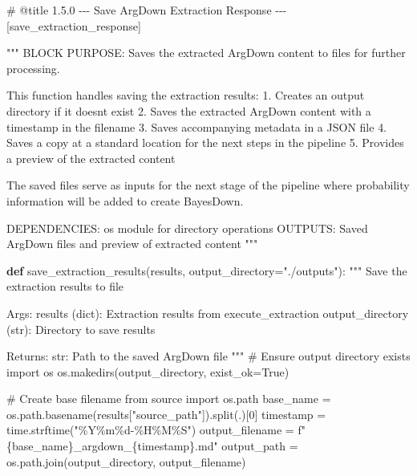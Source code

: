\documentclass[
  11pt,
  letterpaper,
]{book}
\newenvironment{Shaded}{\begin{snugshade}}{\end{snugshade}}
\newcommand{\CommentTok}[1]{\textcolor[rgb]{0.37,0.37,0.37}{#1}}
\newcommand{\DecValTok}[1]{\textcolor[rgb]{0.68,0.00,0.00}{#1}}
\newcommand{\ImportTok}[1]{\textcolor[rgb]{0.00,0.46,0.62}{#1}}
\newcommand{\KeywordTok}[1]{\textcolor[rgb]{0.00,0.23,0.31}{\textbf{#1}}}
\newcommand{\NormalTok}[1]{\textcolor[rgb]{0.00,0.23,0.31}{#1}}
\newcommand{\OperatorTok}[1]{\textcolor[rgb]{0.37,0.37,0.37}{#1}}
\newcommand{\SpecialCharTok}[1]{\textcolor[rgb]{0.37,0.37,0.37}{#1}}
\newcommand{\SpecialStringTok}[1]{\textcolor[rgb]{0.13,0.47,0.30}{#1}}
\newcommand{\StringTok}[1]{\textcolor[rgb]{0.13,0.47,0.30}{#1}}
\newcommand{\VariableTok}[1]{\textcolor[rgb]{0.07,0.07,0.07}{#1}}
\begin{document}
\label{save_extraction_response}
\begin{Shaded}
\begin{Highlighting}[]
\CommentTok{\# @title 1.5.0 {-}{-}{-} Save ArgDown Extraction Response {-}{-}{-} [save\_extraction\_response]}

\CommentTok{"""}
\CommentTok{BLOCK PURPOSE: Saves the extracted ArgDown content to files for further processing.}

\CommentTok{This function handles saving the extraction results:}
\CommentTok{1. Creates an output directory if it doesn\textquotesingle{}t exist}
\CommentTok{2. Saves the extracted ArgDown content with a timestamp in the filename}
\CommentTok{3. Saves accompanying metadata in a JSON file}
\CommentTok{4. Saves a copy at a standard location for the next steps in the pipeline}
\CommentTok{5. Provides a preview of the extracted content}

\CommentTok{The saved files serve as inputs for the next stage of the pipeline where}
\CommentTok{probability information will be added to create BayesDown.}

\CommentTok{DEPENDENCIES: os module for directory operations}
\CommentTok{OUTPUTS: Saved ArgDown files and preview of extracted content}
\CommentTok{"""}

\KeywordTok{def}\NormalTok{ save\_extraction\_results(results, output\_directory}\OperatorTok{=}\StringTok{"./outputs"}\NormalTok{):}
    \CommentTok{"""}
\CommentTok{    Save the extraction results to file}

\CommentTok{    Args:}
\CommentTok{        results (dict): Extraction results from execute\_extraction}
\CommentTok{        output\_directory (str): Directory to save results}

\CommentTok{    Returns:}
\CommentTok{        str: Path to the saved ArgDown file}
\CommentTok{    """}
    \CommentTok{\# Ensure output directory exists}
    \ImportTok{import}\NormalTok{ os}
\NormalTok{    os.makedirs(output\_directory, exist\_ok}\OperatorTok{=}\VariableTok{True}\NormalTok{)}

    \CommentTok{\# Create base filename from source}
    \ImportTok{import}\NormalTok{ os.path}
\NormalTok{    base\_name }\OperatorTok{=}\NormalTok{ os.path.basename(results[}\StringTok{"source\_path"}\NormalTok{]).split(}\StringTok{\textquotesingle{}.\textquotesingle{}}\NormalTok{)[}\DecValTok{0}\NormalTok{]}
\NormalTok{    timestamp }\OperatorTok{=}\NormalTok{ time.strftime(}\StringTok{"\%Y\%m}\SpecialCharTok{\%d}\StringTok{{-}\%H\%M\%S"}\NormalTok{)}
\NormalTok{    output\_filename }\OperatorTok{=} \SpecialStringTok{f"}\SpecialCharTok{\{}\NormalTok{base\_name}\SpecialCharTok{\}}\SpecialStringTok{\_argdown\_}\SpecialCharTok{\{}\NormalTok{timestamp}\SpecialCharTok{\}}\SpecialStringTok{.md"}
\NormalTok{    output\_path }\OperatorTok{=}\NormalTok{ os.path.join(output\_directory, output\_filename)}


\end{Highlighting}
\end{Shaded}
\end{document}
